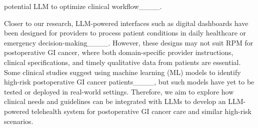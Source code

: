 potential LLM to optimize clinical workflow____.

Closer to our research, LLM-powered interfaces such as digital dashboards have been designed for providers to process patient conditions in daily healthcare or emergency decision-making____. However, these designs may not suit RPM for postoperative GI cancer, where both domain-specific provider instructions, clinical specifications, and timely qualitative data from patients are essential. Some clinical studies suggest using machine learning (ML) models to identify high-risk postoperative GI cancer patients____, but such models have yet to be tested or deployed in real-world settings. Therefore, we aim to explore how clinical needs and guidelines can be integrated with LLMs to develop an LLM-powered telehealth system for postoperative GI cancer care and similar high-risk scenarios.